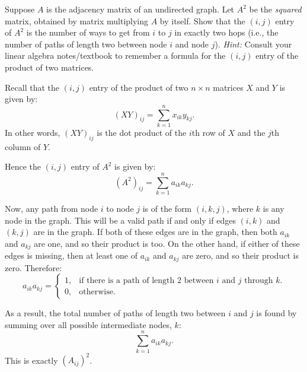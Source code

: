\begin{prob}
    Suppose $A$ is the adjacency matrix of an undirected graph. Let $A^2$
    be the \emph{squared} matrix, obtained by matrix multiplying $A$ by
    itself.  Show that the $(i,j)$ entry of $A^2$ is the number of ways to
    get from $i$ to $j$ in exactly two hops (i.e., the number of paths of
    length two between node $i$ and node $j$).  \emph{Hint:} Consult your
    linear algebra notes/textbook to remember a formula for the $(i,j)$
    entry of the product of two matrices.

    \begin{soln}
        Recall that the $(i,j)$ entry of the product of two $n \times n$
        matrices $X$ and $Y$ is given by:
        \[
            (XY)_{ij} = \sum_{k=1}^n x_{ik} y_{kj}.
        \]
        In other words, $(XY)_{ij}$ is the dot product of the $i$th row of $X$
        and the $j$th column of $Y$.

        Hence the $(i,j)$ entry of $A^2$ is given by:
        \[
            (A^2)_{ij} = \sum_{k=1}^n a_{ik} a_{kj}.
        \]

        Now, any path from node $i$ to node $j$ is of the form $(i,k,j)$, where
        $k$ is any node in the graph. This will be a valid path if and only if
        edges $(i,k)$ and $(k,j)$ are in the graph. If both of these edges are
        in the graph, then both $a_{ik}$ and $a_{kj}$ are one, and so their product
        is too. On the other hand, if either of these edges is missing, then at 
        least one of $a_{ik}$ and $a_{kj}$ are zero, and so their product is zero.
        Therefore:
        \[
            a_{ik} a_{kj} = \begin{cases}
                1,& \text{if there is a path of length 2 between $i$ and $j$ through $k$.}\\
                0,&\text{otherwise}.
            \end{cases}
        \]

        As a result, the total number of paths of length two between $i$ and $j$ is
        found by summing over all possible intermediate nodes, $k$:
        \[
            \sum_{k=1}^n a_{ik} a_{kj}.
        \]
        This is exactly $(A_{ij})^2$.
    \end{soln}
\end{prob}
